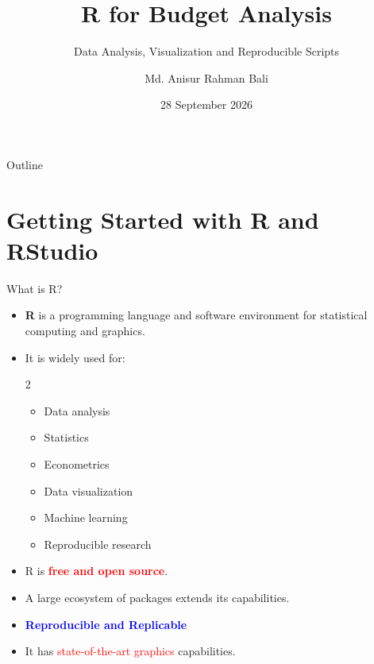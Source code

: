 \documentclass[aspectratio=169,11pt]{beamer}
\title{R for Budget Analysis}
\subtitle{Data Analysis, Visualization and Reproducible Scripts}
\author{Md. Anisur Rahman Bali}
\institute{Finance Division\\Ministry of Finance, Bangladesh}
\date{28 September 2026}
\begin{document}
	
	\begin{frame}
		\titlepage
	\end{frame}
	
	\begin{frame}{Outline}
		
		\tableofcontents
		
	\end{frame}
	
	\section{Getting Started with R and RStudio}
	
	\begin{frame}{What is R?}
		
		\begin{itemize}
			\item \textbf{R} is a programming language and software environment
			for statistical computing and graphics.
			
			\item It is widely used for:
			\begin{multicols}{2}	
			\begin{itemize}
				\item Data analysis
				\item Statistics
				\item Econometrics
				\item Data visualization
				\item Machine learning
				\item Reproducible research
			\end{itemize}
			\end{multicols}
			
			\item R is \textcolor{red}{\textbf{free and open source}}.
			
			\item A large ecosystem of packages extends its capabilities.
			
			\item \textcolor{blue} {\textbf{Reproducible and Replicable}}
			
			\item It has \textcolor{red} { state-of-the-art graphics} capabilities.
			
		\end{itemize}
		
	\end{frame}
	
\end{document}
